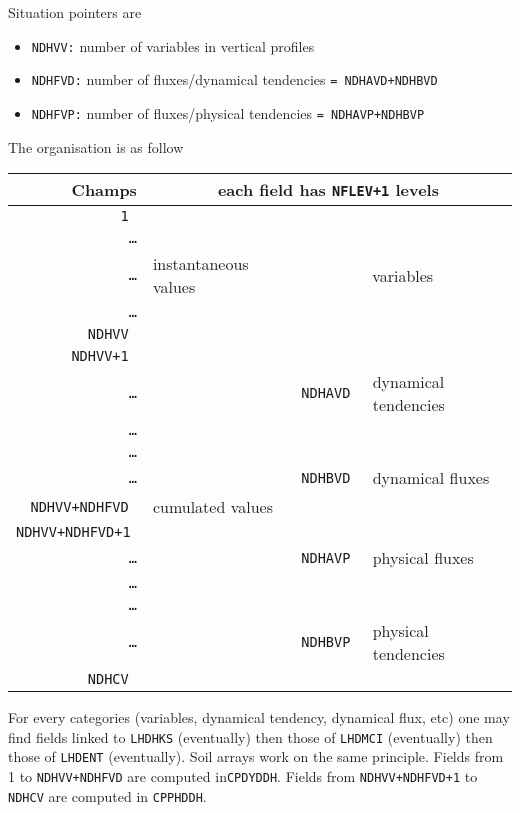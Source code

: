 Situation pointers are
\begin{itemize}
\item {\tt NDHVV:} number of variables in vertical profiles
\item {\tt NDHFVD:} number of fluxes/dynamical tendencies {\tt = NDHAVD+NDHBVD}
\item {\tt NDHFVP:} number of fluxes/physical tendencies {\tt = NDHAVP+NDHBVP}
\end{itemize}
\ms
The organisation is as follow
\begin{center}
\begin{tabular}{|r|l|l|l|}
\hline
Champs & \multicolumn{3}{c|}{each field has {\tt NFLEV+1} levels} \\
\hline \hline
\tt 1 & & \multicolumn{2}{c|}{} \\
\cline{1-1}
\tt \dots & & \multicolumn{2}{c|}{} \\
\cline{1-1}
\tt \dots & instantaneous values & \multicolumn{2}{c|}{variables} \\
\cline{1-1}
\tt \dots & & \multicolumn{2}{c|}{} \\
\cline{1-1}
\tt NDHVV & & \multicolumn{2}{c|}{} \\
\hline
%
\tt NDHVV+1 & & & \\
\cline{1-1}
\tt \dots & & \tt NDHAVD & dynamical tendencies \\
\cline{1-1}
\tt \dots & & & \\
\cline{1-1} \cline{3-4}
\tt \dots &  & & \\
\cline{1-1}
\tt \dots & & \tt NDHBVD & dynamical fluxes\\
\cline{1-1}
\tt NDHVV+NDHFVD & cumulated values & & \\
\cline{1-1} \cline{3-4}
%
\tt NDHVV+NDHFVD+1 & & & \\
\cline{1-1}
\tt \dots & & \tt NDHAVP & physical fluxes \\
\cline{1-1}
\tt \dots & & & \\
\cline{1-1} \cline{3-4}
\tt \dots &  & & \\
\cline{1-1}
\tt \dots & & \tt NDHBVP & physical tendencies \\
\cline{1-1}
\tt NDHCV & & & \\
\hline
\end{tabular}

\end{center}

For every categories (variables, dynamical tendency, dynamical flux, etc) one may find fields linked to {\tt LHDHKS} (eventually) then those of {\tt LHDMCI} (eventually) then those of {\tt LHDENT} (eventually).
Soil arrays work on the same principle.
Fields from 1 to {\tt NDHVV+NDHFVD} are computed in{\tt CPDYDDH}. Fields from {\tt NDHVV+NDHFVD+1} to {\tt NDHCV} are computed in {\tt CPPHDDH}.
